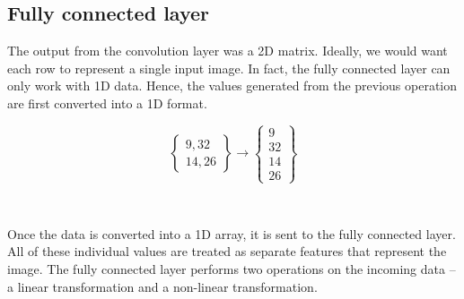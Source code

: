 \subsection{Fully connected layer}
The output from the convolution layer was a 2D matrix. Ideally, we would want each row to represent a single input image. In fact, the fully connected layer can only work with 1D data. Hence, the values generated from the previous operation are first converted into a 1D format.\\
\begin{center}
    \begin{large}$$
        \begin{Bmatrix}
         9, 32 \\
         14,26
        \end{Bmatrix}
        \rightarrow
        \begin{Bmatrix}
         9 \\ 32 \\ 14 \\26
        \end{Bmatrix}$$
    \end{large} \\
\end{center}
Once the data is converted into a 1D array, it is sent to the fully connected layer. All of these individual values are treated as separate features that represent the image. The fully connected layer performs two operations on the incoming data – a linear transformation and a non-linear transformation.\\